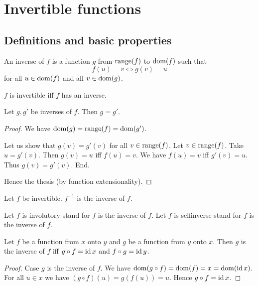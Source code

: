 \documentclass[../../sets-and-functions.ftl.tex]{subfiles}
\begin{document}
  \section{Invertible functions}

  \subsection{Definitions and basic properties}

  \begin{forthel}
    \begin{definition}
      An inverse of $f$ is a function $g$ from $\operatorname{range}(f)$ to $\operatorname{dom}(f)$ such that \[ f(u) = v \iff g(v) = u \] for all $u \in \operatorname{dom}(f)$ and all $v \in \operatorname{dom}(g)$.
    \end{definition}

    \begin{definition}
      $f$ is invertible iff $f$ has an inverse.
    \end{definition}

    \begin{lemma}
      Let $g,g'$ be inverses of $f$.
      Then $g = g'$.
    \end{lemma}
    \begin{proof}
      We have $\operatorname{dom}(g) = \operatorname{range}(f) = \operatorname{dom}(g')$.

      Let us show that $g(v) = g'(v)$ for all $v \in \operatorname{range}(f)$.
        Let $v \in \operatorname{range}(f)$.
        Take $u = g'(v)$.
        Then $g(v) = u$ iff $f(u) = v$.
        We have $f(u) = v$ iff $g'(v) = u$.
        Thus $g(v) = g'(v)$.
      End.

      Hence the thesis (by function extensionality).
    \end{proof}

    \begin{definition}
      Let $f$ be invertible.
      $f^{-1}$ is the inverse of $f$.
    \end{definition}

    Let $f$ is involutory stand for $f$ is the inverse of $f$.
    Let $f$ is selfinverse stand for $f$ is the inverse of $f$.

    \begin{proposition}[SF 02 03 587168]
      Let $f$ be a function from $x$ onto $y$ and $g$ be a function from $y$ onto $x$.
      Then $g$ is the inverse of $f$ iff $g \circ f = \operatorname{id}{x}$ and $f \circ g = \operatorname{id}{y}$.
    \end{proposition}
    \begin{proof}
      Case $g$ is the inverse of $f$.
        We have $\operatorname{dom}(g \circ f) = \operatorname{dom}(f) = x = \operatorname{dom}(\operatorname{id}{x})$.
        For all $u \in x$ we have $(g \circ f)(u) = g(f(u)) = u$.
        Hence $g \circ f = \operatorname{id}{x}$.


\end{proof}
\end{forthel}
\end{document}
